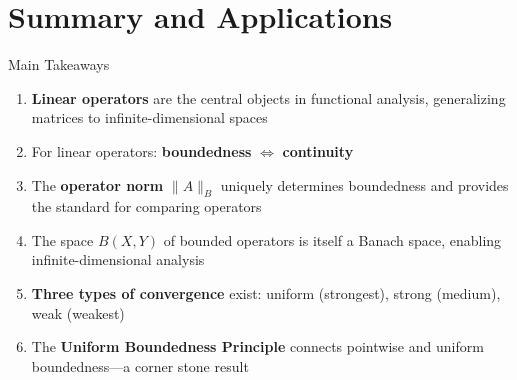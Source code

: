 \documentclass[aspectratio=169,10pt]{beamer}
\begin{document}
\section{Summary and Applications}

\begin{frame}{Main Takeaways}
    \begin{enumerate}
        \item \textbf{Linear operators} are the central objects in functional analysis, generalizing matrices to infinite-dimensional spaces

        \vspace{0.3cm}

        \item For linear operators: \textbf{boundedness} $\Leftrightarrow$ \textbf{continuity}

        \vspace{0.3cm}

        \item The \textbf{operator norm} $\|A\|_B$ uniquely determines boundedness and provides the standard for comparing operators

        \vspace{0.3cm}

        \item The space $B(X, Y)$ of bounded operators is itself a Banach space, enabling infinite-dimensional analysis

        \vspace{0.3cm}

        \item \textbf{Three types of convergence} exist: uniform (strongest), strong (medium), weak (weakest)

        \vspace{0.3cm}

        \item The \textbf{Uniform Boundedness Principle} connects pointwise and uniform boundedness—a corner stone result
    \end{enumerate}
\end{frame}
\end{document}
